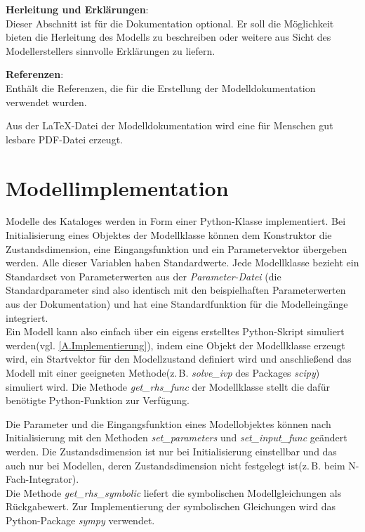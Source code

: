 \textbf{Herleitung und Erklärungen}:\\
Dieser Abschnitt ist für die Dokumentation optional. Er soll die Möglichkeit bieten die Herleitung des Modells zu beschreiben oder weitere aus Sicht des Modellerstellers sinnvolle Erklärungen zu liefern.

\textbf{Referenzen}:\\
Enthält die Referenzen, die für die Erstellung der Modelldokumentation verwendet wurden.

Aus der \LaTeX-Datei der Modelldokumentation wird eine für Menschen gut lesbare PDF-Datei erzeugt. 

\section{Modellimplementation}
\label{Ch:Ergebnisse:Sec:Implementation}
Modelle des Kataloges werden in Form einer Python-Klasse implementiert. Bei Initialisierung eines Objektes der Modellklasse können dem Konstruktor die Zustandsdimension, eine Eingangsfunktion und ein Parametervektor übergeben werden. Alle dieser Variablen haben Standardwerte. Jede Modellklasse bezieht ein Standardset von Parameterwerten aus der \textit{Parameter-Datei} (die Standardparameter sind also identisch mit den beispielhaften Parameterwerten aus der Dokumentation) und hat eine Standardfunktion für die Modelleingänge integriert.\\ 
Ein Modell kann also einfach über ein eigens erstelltes Python-Skript simuliert werden(vgl. \ref{A.Implementierung}), indem eine Objekt der Modellklasse erzeugt wird, ein Startvektor für den Modellzustand definiert wird und anschließend das Modell mit einer geeigneten Methode(z.\,B. \textit{solve\_ivp} des Packages \textit{scipy}) simuliert wird. Die Methode \textit{get\_rhs\_func} der Modellklasse stellt die dafür benötigte Python-Funktion zur Verfügung.

Die Parameter und die Eingangsfunktion eines Modellobjektes können nach Initialisierung mit den Methoden \textit{set\_parameters} und \textit{set\_input\_func} geändert werden. Die Zustandsdimension ist nur bei Initialisierung einstellbar und das auch nur bei Modellen, deren Zustandsdimension nicht festgelegt ist(z.\,B. beim N-Fach-Integrator).\\
Die Methode \textit{get\_rhs\_symbolic} liefert die symbolischen Modellgleichungen als Rückgabewert. Zur Implementierung der symbolischen Gleichungen wird das Python-Package \textit{sympy} verwendet.

